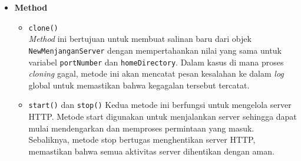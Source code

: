 \begin{itemize}
    \item \textbf{Method}
    \begin{itemize}
        \item \texttt{clone()}
        \\ \textit{Method} ini bertujuan untuk membuat salinan baru dari objek \texttt{NewMenjanganServer} dengan mempertahankan nilai yang sama untuk variabel \texttt{portNumber} dan \texttt{homeDirectory}. Dalam kasus di mana proses \textit{cloning} gagal, metode ini akan mencatat pesan kesalahan ke dalam \textit{log} global untuk memastikan bahwa kegagalan tersebut tercatat.
        \item \texttt{start()} dan \texttt{stop()}
        Kedua metode ini berfungsi untuk mengelola server HTTP. Metode start digunakan untuk menjalankan server sehingga dapat mulai mendengarkan dan memproses permintaan yang masuk. Sebaliknya, metode stop bertugas menghentikan server HTTP, memastikan bahwa semua aktivitas server dihentikan dengan aman.
    \end{itemize}
\end{itemize}

